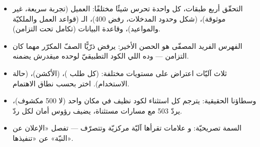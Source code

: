 \begin{summary}
\begin{itemize}
  \item التحقّق أربع طبقات، كل واحدة تحرس شيئًا مختلفًا: العميل (تجربة سريعة، غير موثوقة)،  (شكل وحدود المدخلات، رفض 400)، الـ (قواعد العمل والملكيّة والمواعيد)، وقاعدة البيانات (تكامل تحت التزامن).
  \item الفهرس الفريد المصفّى هو الحصن الأخير: يرفض ذرّيًّا الصفّ المكرّر مهما كان التزامن — وده اللي الكود التطبيقيّ لوحده ميقدرش يضمنه.
  \item ثلاث آليّات اعتراض على مستويات مختلفة:  (كل طلب )،  (الأكشن)،  (حالة الاستخدام). اختر بحسب نطاق الاهتمام.
  \item وسطاؤنا الحقيقية:  يترجم كل استثناء لكود  نظيف في مكان واحد (لا 500 مكشوف)،  يردّ 503 مع مسارات مستثناة،  يضيف رؤوس أمان لكل ردّ.
  \item السمة تصريحيّة: \code{[Authorize]} و\code{[Auditable]} علامات تقرأها آليّة مركزيّة وتتصرّف — تفصل «الإعلان عن النيّة» عن «تنفيذها».
\end{itemize}
\end{summary}

